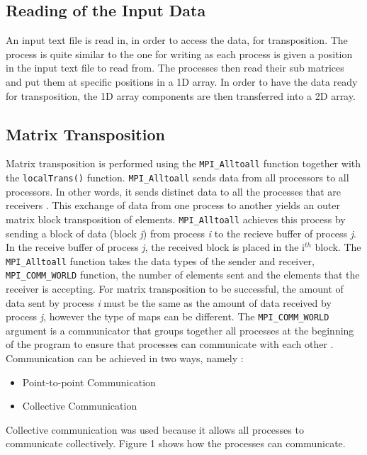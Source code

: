 \documentclass[11pt,conference]{IEEEtran}
\begin{document}
\subsection{Reading of the Input Data}
\noindent
An input text file is read in, in order to access the data, for transposition. The process is quite similar to the one for writing as each process is given a position in the input text file to read from. The processes then read their sub matrices and put them at specific positions in a 1D array. In order to have the data ready for transposition, the 1D array components are then transferred into a 2D array.

\subsection{Matrix Transposition}
\noindent
Matrix transposition is performed using the \texttt{MPI\_Alltoall} function together with the  \texttt{localTrans()} function. \texttt{MPI\_Alltoall} sends data from all processors to all processors. In other words, it sends distinct data to all the processes that are receivers \cite{1}. This exchange of data from one process to another yields an outer matrix block transposition of elements. \texttt{MPI\_Alltoall} achieves this process by sending a block of data (block \textit{j}) from process \textit{i} to the recieve buffer of process \textit{j}. In the receive buffer of process \textit{j}, the received block is placed in the i$^{th}$ block. The \texttt{MPI\_Alltoall} function takes the data types of the sender and receiver, \texttt{MPI\_COMM\_WORLD} function, the number of elements sent and the elements that the receiver is accepting. For matrix transposition to be successful, the amount of data sent by process \textit{i} must be the same as the amount of data received by process \textit{j}, however the type of maps can be different. The \texttt{MPI\_COMM\_WORLD} argument is a communicator that groups together all processes at the beginning of the program to ensure that processes can communicate with each other \cite{2}. Communication can be achieved in two ways, namely \cite{2}:
\begin{itemize}
    \item Point-to-point Communication
    \item Collective Communication
\end{itemize}
Collective communication was used because it allows all processes to communicate collectively. Figure 1 shows how the processes can communicate.
\end{document}
